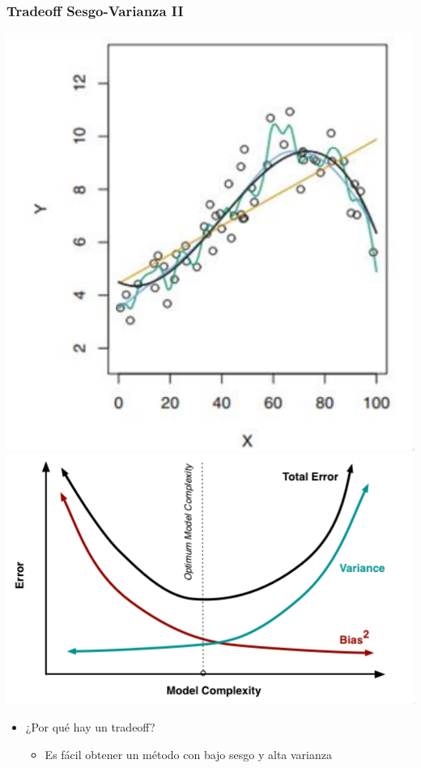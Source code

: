 \documentclass[leqno, 10pt, envcountsect]{beamer}
\numberwithin{equation}{section}
\theoremstyle{definition}
\theoremstyle{example}
\numberwithin{figure}{section}
\numberwithin{table}{section}
\let\olditem\item
\renewcommand{\item}{%
\olditem\vspace{1pt}}
\begin{document}
\begin{frame}
  \frametitle{Tradeoff Sesgo-Varianza II}
  \begin{center}
    \includegraphics[scale=0.25]{bvt2.png}
    \includegraphics[scale=0.225]{complexity.png}
  \end{center}
  \begin{itemize}
    \item ¿Por qué hay un tradeoff?
      \begin{itemize}
        \item Es fácil obtener un método con bajo sesgo y alta varianza

\end{itemize}
\end{itemize}
\end{frame}
\end{document}
